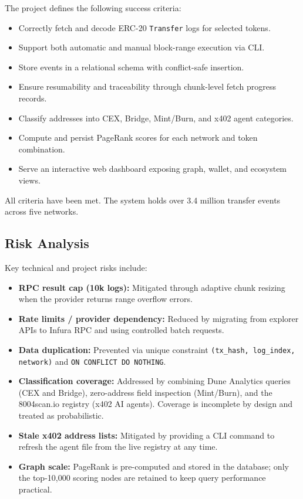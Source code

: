 \documentclass[a4paper,12pt]{report}
\begin{document}
The project defines the following success criteria:

\begin{itemize}
\item Correctly fetch and decode ERC-20 \texttt{Transfer} logs for selected tokens.
\item Support both automatic and manual block-range execution via CLI.
\item Store events in a relational schema with conflict-safe insertion.
\item Ensure resumability and traceability through chunk-level fetch progress records.
\item Classify addresses into CEX, Bridge, Mint/Burn, and x402 agent categories.
\item Compute and persist PageRank scores for each network and token combination.
\item Serve an interactive web dashboard exposing graph, wallet, and ecosystem views.
\end{itemize}

All criteria have been met. The system holds over 3.4 million transfer events across five networks.

\subsection{Risk Analysis}

Key technical and project risks include:

\begin{itemize}
\item \textbf{RPC result cap (10k logs):} Mitigated through adaptive chunk resizing when the
provider returns range overflow errors.
\item \textbf{Rate limits / provider dependency:} Reduced by migrating from explorer APIs to Infura
RPC and using controlled batch requests.
\item \textbf{Data duplication:} Prevented via unique constraint \texttt{(tx\_hash, log\_index,
network)} and \texttt{ON CONFLICT DO NOTHING}.
\item \textbf{Classification coverage:} Addressed by combining Dune Analytics queries (CEX and
Bridge), zero-address field inspection (Mint/Burn), and the 8004scan.io registry (x402 AI agents).
Coverage is incomplete by design and treated as probabilistic.
\item \textbf{Stale x402 address lists:} Mitigated by providing a CLI command to refresh the agent
file from the live registry at any time.
\item \textbf{Graph scale:} PageRank is pre-computed and stored in the database; only the top-10,000
scoring nodes are retained to keep query performance practical.
\end{itemize}
\end{document}
